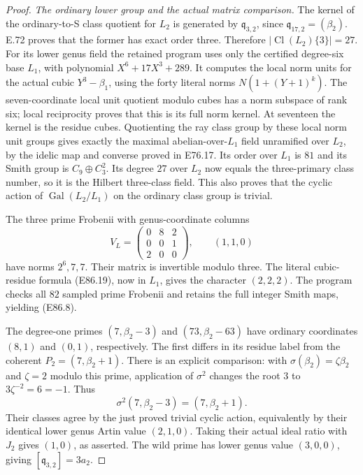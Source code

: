 \begin{proof}
\emph{The ordinary lower group and the actual matrix comparison.}
The kernel of the ordinary-to-S class quotient
for $L_2$ is generated by $\mathfrak q_{3,2}$,
since $\mathfrak q_{17,2}=(\beta_2)$.
E.72 proves that the former has exact order
three. Therefore $|\operatorname{Cl}(L_2)\{3\}|=27$.
For its lower genus field the retained program
uses only the certified degree-six base
$L_1$, with polynomial $X^6+17X^3+289$.
It computes the local norm units for the
actual cubic $Y^3-\beta_1$, using the forty
literal norms $N(1+(Y+1)^k)$.
The seven-coordinate local unit quotient
modulo cubes has a norm subspace of rank
six; local reciprocity proves that this is
its full norm kernel. At seventeen the
kernel is the residue cubes. Quotienting
the ray class group by these local norm
unit groups gives exactly the maximal
abelian-over-$L_1$ field unramified over
$L_2$, by the idelic map and converse
proved in E76.17. Its order over $L_1$
is $81$ and its Smith group is
$C_9\oplus C_3^2$. Its degree $27$ over
$L_2$ now equals the three-primary class number,
so it is the Hilbert three-class field.
This also proves that the cyclic action
of $\operatorname{Gal}(L_2/L_1)$ on the
ordinary class group is trivial.

The three prime Frobenii with genus-coordinate
columns
\[
 V_L=\begin{pmatrix}0&8&2\\0&0&1\\2&0&0\end{pmatrix},
 \qquad (1,1,0)
 \tag{E86.24}
\]
have norms $2^6,7,7$. Their matrix is
invertible modulo three. The literal
cubic-residue formula (E86.19), now in
$L_1$, gives the character $(2,2,2)$.
The program checks all $82$ sampled prime
Frobenii and retains the full integer
Smith maps, yielding (E86.8).

The degree-one primes $(7,\beta_2-3)$ and
$(73,\beta_2-63)$ have ordinary coordinates
$(8,1)$ and $(0,1)$, respectively.
The first differs in its residue label
from the coherent $P_2=(7,\beta_2+1)$.
There is an explicit comparison: with
$\sigma(\beta_2)=\zeta\beta_2$ and
$\zeta=2$ modulo this prime, application
of $\sigma^2$ changes the root $3$ to
$3\zeta^{-2}=6=-1$. Thus
\[
 \sigma^2(7,\beta_2-3)=(7,\beta_2+1).
 \tag{E86.25}
\]
Their classes agree by the just proved
trivial cyclic action, equivalently by
their identical lower genus Artin value
$(2,1,0)$. Taking their actual ideal ratio
with $J_2$ gives $(1,0)$, as asserted.
The wild prime has lower genus value
$(3,0,0)$, giving $[\mathfrak q_{3,2}]=3a_2$.


\end{proof}
